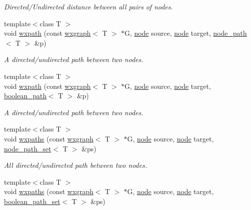 \begin{DoxyCompactItemize}
\begin{DoxyCompactList}\small\item\em Directed/\-Undirected distance between all pairs of nodes. \end{DoxyCompactList}\item 
{\footnotesize template$<$class T $>$ }\\void \hyperlink{namespacelgraph_1_1traversal_acb255be04a53f1d3863f7beaeda2dde0}{wxpath} (const \hyperlink{classlgraph_1_1wxgraph}{wxgraph}$<$ T $>$ $\ast$G, \hyperlink{namespacelgraph_a397169dd66adf725210a30fb7251773e}{node} source, \hyperlink{namespacelgraph_a397169dd66adf725210a30fb7251773e}{node} target, \hyperlink{classlgraph_1_1node__path}{node\-\_\-path}$<$ T $>$ \&p)
\begin{DoxyCompactList}\small\item\em A directed/undirected path between two nodes. \end{DoxyCompactList}\item 
{\footnotesize template$<$class T $>$ }\\void \hyperlink{namespacelgraph_1_1traversal_a2e3286cb7b83c0a47820b1d7256231ab}{wxpath} (const \hyperlink{classlgraph_1_1wxgraph}{wxgraph}$<$ T $>$ $\ast$G, \hyperlink{namespacelgraph_a397169dd66adf725210a30fb7251773e}{node} source, \hyperlink{namespacelgraph_a397169dd66adf725210a30fb7251773e}{node} target, \hyperlink{classlgraph_1_1boolean__path}{boolean\-\_\-path}$<$ T $>$ \&p)
\begin{DoxyCompactList}\small\item\em A directed/undirected path between two nodes. \end{DoxyCompactList}\item 
{\footnotesize template$<$class T $>$ }\\void \hyperlink{namespacelgraph_1_1traversal_a97b92a041fa93b26f26d60d11f717dc5}{wxpaths} (const \hyperlink{classlgraph_1_1wxgraph}{wxgraph}$<$ T $>$ $\ast$G, \hyperlink{namespacelgraph_a397169dd66adf725210a30fb7251773e}{node} source, \hyperlink{namespacelgraph_a397169dd66adf725210a30fb7251773e}{node} target, \hyperlink{namespacelgraph_a0570ce57129123d5816913d287f6cc73}{node\-\_\-path\-\_\-set}$<$ T $>$ \&ps)
\begin{DoxyCompactList}\small\item\em All directed/undirected path between two nodes. \end{DoxyCompactList}\item 
{\footnotesize template$<$class T $>$ }\\void \hyperlink{namespacelgraph_1_1traversal_af4f6d2630d596387b4ba4891c55a3773}{wxpaths} (const \hyperlink{classlgraph_1_1wxgraph}{wxgraph}$<$ T $>$ $\ast$G, \hyperlink{namespacelgraph_a397169dd66adf725210a30fb7251773e}{node} source, \hyperlink{namespacelgraph_a397169dd66adf725210a30fb7251773e}{node} target, \hyperlink{namespacelgraph_afad432931ba600ab1628d5c9595986c5}{boolean\-\_\-path\-\_\-set}$<$ T $>$ \&ps)

\end{DoxyCompactItemize}
